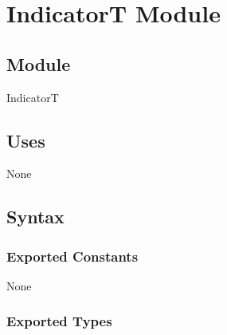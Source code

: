 \documentclass[12pt]{article}
\newcommand{\authornote}[3]{\textcolor{#1}{[#3 ---#2]}}
\newcommand{\authornote}[3]{}
\newcommand{\wss}[1]{\authornote{blue}{SS}{#1}}
\begin{document}


% 
% 

\newpage

\section* {IndicatorT Module}

\subsection*{Module}

IndicatorT

\subsection* {Uses}

None

\subsection* {Syntax}

\subsubsection* {Exported Constants}

None

\subsubsection* {Exported Types}
\end{document}
